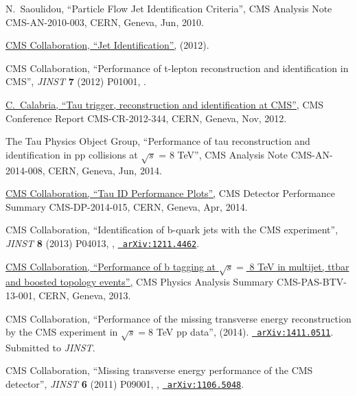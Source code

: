 \documentclass[12pt]{thesis}  %
\begin{document}
\begin{thebibliography}{100}
\hrefCMSnoop {} {N.~Saoulidou, ``Particle Flow Jet Identification Criteria'',}
  CMS Analysis Note CMS-AN-2010-003, CERN, Geneva, Jun, 2010.

\href {https://twiki.cern.ch/twiki/bin/viewauth/CMS/JetID} {{ CMS}
  Collaboration, ``Jet Identification'',} (2012).

\hrefCMSnoop {} {{ CMS} Collaboration, ``Performance of t-lepton reconstruction
  and identification in CMS'',} \textit{ JINST} \textbf{ 7} (2012) P01001,
  \href{http://dx.doi.org/10.1088/1748-0221/7/01/P01001}{}.

\href {https://cds.cern.ch/record/1516071} {C.~Calabria, ``{Tau trigger,
  reconstruction and identification at CMS}'',} CMS Conference Report
  CMS-CR-2012-344, CERN, Geneva, Nov, 2012.

\hrefCMSnoop {} {{The Tau Physics Object Group}, ``Performance of tau
  reconstruction and identification in pp collisions at $\sqrt{s}$ = 8 TeV'',}
  CMS Analysis Note CMS-AN-2014-008, CERN, Geneva, Jun, 2014.

\href {https://cds.cern.ch/record/1704439} {{ CMS} Collaboration, ``{Tau ID
  Performance Plots}'',} CMS Detector Performance Summary CMS-DP-2014-015,
  CERN, Geneva, Apr, 2014.

\hrefCMSnoop {} {{ CMS} Collaboration, ``{Identification of b-quark jets with
  the CMS experiment}'',} \textit{ JINST} \textbf{ 8} (2013) P04013,
  \href{http://dx.doi.org/10.1088/1748-0221/8/04/P04013}{},
\href{http://www.arXiv.org/abs/1211.4462}{\texttt{ arXiv:1211.4462}}.

\href {http://cds.cern.ch/record/1581306/} {{ CMS} Collaboration,
  ``{Performance of b tagging at $\sqrt{s} =$ 8 TeV in multijet, ttbar and
  boosted topology events}'',} CMS Physics Analysis Summary CMS-PAS-BTV-13-001,
  CERN, Geneva, 2013.

\hrefCMSnoop {} {{ CMS} Collaboration, ``Performance of the missing transverse
  energy reconstruction by the CMS experiment in $\sqrt{s} = 8$ TeV pp data'',}
  (2014). \href{http://www.arXiv.org/abs/1411.0511}{\texttt{ arXiv:1411.0511}}.
  Submitted to \emph{JINST}.

\hrefCMSnoop {} {{ CMS} Collaboration, ``Missing transverse energy performance
  of the CMS detector'',} \textit{ JINST} \textbf{ 6} (2011) P09001,
  \href{http://dx.doi.org/doi:10.1088/1748-0221/6/09/P09001}{},
  \href{http://www.arXiv.org/abs/1106.5048}{\texttt{ arXiv:1106.5048}}.


\end{thebibliography}
\end{document}
